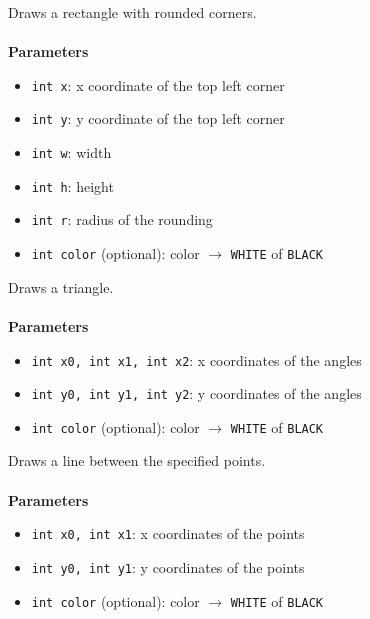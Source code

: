 \documentclass[11pt,fleqn]{book} %
\begin{document}
\begin{libf}[drawRoundRect(x, y, w, h, r, \emph{color=WHITE})]
	Draws a rectangle with rounded corners.\\ \\
	\textbf{Parameters}
	\begin{itemize}
		\item \texttt{int x}: x coordinate of the top left corner
		\item \texttt{int y}: y coordinate of the top left corner
		\item \texttt{int w}: width
		\item \texttt{int h}: height
		\item \texttt{int r}: radius of the rounding
		\item \texttt{int color} (optional): color $\rightarrow$ \texttt{WHITE} of \texttt{BLACK}
	\end{itemize}
\end{libf}

\begin{libf}[drawTriangle(x0, y0, x1, y1, x2, y2, \emph{color=WHITE})]
	Draws a triangle.\\ \\
	\textbf{Parameters}
	\begin{itemize}
		\item \texttt{int x0, int x1, int x2}: x coordinates of the angles
		\item \texttt{int y0, int y1, int y2}: y coordinates of the angles
		\item \texttt{int color} (optional): color $\rightarrow$ \texttt{WHITE} of \texttt{BLACK}
	\end{itemize}
\end{libf}

\newpage

\begin{libf}[drawLine(x0, y0, x1, y1, \emph{color=WHITE})]
	Draws a line between the specified points.\\ \\
	\textbf{Parameters}
	\begin{itemize}
		\item \texttt{int x0, int x1}: x coordinates of the points
		\item \texttt{int y0, int y1}: y coordinates of the points
		\item \texttt{int color} (optional): color $\rightarrow$ \texttt{WHITE} of \texttt{BLACK}
	\end{itemize}
\end{libf}
\end{document}

